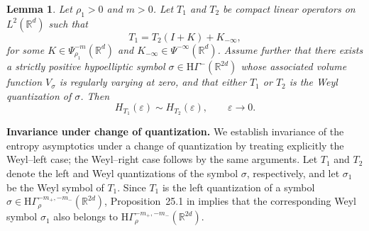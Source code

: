 \documentclass[a4paper,12pt]{article}
\newtheorem{lemma}[theorem]{Lemma}%
\let\originalleft\left
\let\originalright\right
\renewcommand{\left}{\mathopen{}\mathclose\bgroup\originalleft}
\renewcommand{\right}{\aftergroup\egroup\originalright}
\newcommand{\R}{\mathbb{R}}
\newcommand{\hyposymbclassinv}{\mathrm{H}\Gamma^{-m_+,-m_-}_\rho}
\newcommand{\hyponegclass}{\mathrm{H}\Gamma^-}
\begin{document}
\begin{lemma}\label{lem:technical-lemma}
Let $\rho_1>0$ and $m>0$.
Let $T_1$ and $T_2$ be compact linear operators on $L^2(\R^d)$ such that
\[
T_1 = T_2 (I + K) + K_{-\infty},
\]
for some $K\in \Psi^{-m}_{\rho_1}(\R^d)$ and $K_{-\infty}\in\Psi^{-\infty}(\R^d)$.
Assume further that there exists a strictly positive hypoelliptic symbol
$\sigma\in\hyponegclass(\R^{2d})$ whose associated volume function $V_\sigma$ is
regularly varying at zero, %
and that either $T_1$ or $T_2$ is the Weyl quantization
of $\sigma$.
Then %
\begin{equation}\label{eq:technical-lemma-result}
    H_{T_1}(\varepsilon)
    \sim
    H_{T_2}(\varepsilon),
    \qquad \varepsilon \to 0.
\end{equation}
\end{lemma}






\textbf{Invariance under change of quantization.}
We establish invariance of the entropy asymptotics under a change of
quantization by treating explicitly the Weyl–left case; the Weyl–right case
follows by the same arguments. Let $T_1$ and $T_2$ denote the left and Weyl quantizations of the symbol $\sigma$,
respectively, and let $\sigma_1$ be the Weyl symbol of $T_1$.
Since $T_1$ is the left quantization of a symbol
$\sigma\in\hyposymbclassinv(\R^{2d})$,
Proposition~25.1 in \cite{shubin_pseudodifferential_2001} implies that
the corresponding Weyl symbol $\sigma_1$ also belongs to
$\hyposymbclassinv(\R^{2d})$.
\end{document}
